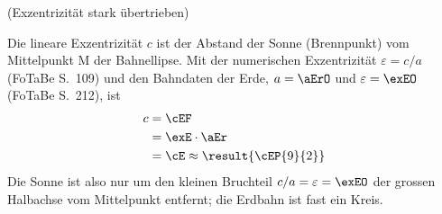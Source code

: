 \begin{center}

(Exzentrizität stark übertrieben)
\end{center}

Die lineare Exzentrizität $c$ ist der Abstand der Sonne (Brennpunkt) vom Mittelpunkt M der Bahnellipse. Mit der numerischen Exzentrizität $\varepsilon = c/a$ (FoTaBe S.~109) und den Bahndaten der Erde, $a = \aErO$ und $\varepsilon = \exEO$ (FoTaBe S.~212), ist
\begin{align}
 c &= \cEF \\
   &= \exE\cdot\aEr \\
   &= \cE \approx \result{\cEP{9}{2}}
\end{align}
Die Sonne ist also nur um den kleinen Bruchteil $c/a = \varepsilon = \exEO$ der grossen Halbachse vom Mittelpunkt entfernt; die Erdbahn ist fast ein Kreis.
